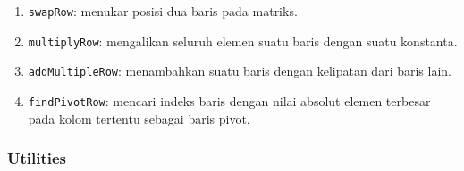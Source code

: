 \documentclass{article}
\begin{document}
\begin{enumerate}

    \item{\texttt{swapRow}: menukar posisi dua baris pada matriks.}

    \item{\texttt{multiplyRow}: mengalikan seluruh elemen suatu baris dengan suatu konstanta.}

    \item{\texttt{addMultipleRow}: menambahkan suatu baris dengan kelipatan dari baris lain.}

    \item{\texttt{findPivotRow}: mencari indeks baris dengan nilai absolut elemen terbesar pada kolom tertentu sebagai baris pivot.}

\end{enumerate}


\subsubsection{Utilities}

\end{document}
